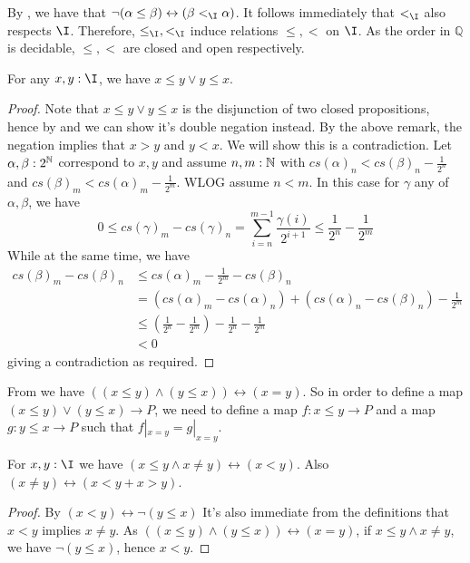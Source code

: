 \begin{remark}\label{NegationOfGeq}
  By , we have that $\neg (\alpha \leq \beta) \leftrightarrow (\beta <_\I \alpha)$. 
  It follows immediately that $<_\I$ also respects $\I$. 
  Therefore, $\leq_\I, <_\I$ induce relations $\leq,<$ on $\I$.
  As the order in $\mathbb Q$ is decidable, $\leq, <$ are closed and open respectively. 
\end{remark} 

\begin{lemma}\label{IntervalOrderLeqOrGeq}
  For any $x,y:\I$, we have $x\leq y \vee y \leq x$. 
\end{lemma}
\begin{proof}
  Note that $x\leq y \vee y \leq x$ is the disjunction of two closed propositions, hence by 
   and  we can show it's double negation instead. 
  By the above remark, the negation implies that $x>y$ and $y<x$. We will show this is a contradiction. 
  Let $\alpha,\beta:2^{\mathbb{N}}$ correspond to $x,y$ and assume $n,m:\mathbb{N}$ with 
  $cs(\alpha)_n < cs(\beta)_n-\frac{1}{2^n}$ and 
  $cs(\beta)_m < cs(\alpha)_m-\frac{1}{2^m}$. 
  WLOG assume $n<m$. In this case for $\gamma$ any of $\alpha,\beta$, we have
  $$0\leq cs(\gamma)_m - cs(\gamma)_n = \sum_{i = n}^{m-1} \frac{\gamma(i)}{2^{i+1}}\leq \frac{1}{2^n}-\frac{1}{2^m}$$
  While at the same time, we have 
  \begin{align}
    cs(\beta)_m - cs(\beta)_n &\leq cs(\alpha)_m -\frac{1}{2^m} - cs (\beta)_n \\
                              & = (cs(\alpha)_m-cs(\alpha)_n)  +      (cs(\alpha)_n -cs(\beta)_n) - \frac{1}{2^m}\\
                              & \leq (\frac{1}{2^n} - \frac{1}{2^m}) -\frac{1}{2^n}               - \frac{1}{2^m}\\
                              &<0
  \end{align}
  giving a contradiction as required. 
\end{proof}

\begin{remark}\label{rmkMapOutOfLeqGeq}
  From  we have $((x\leq y) \wedge (y \leq x )) \leftrightarrow (x = y)$. 
  So in order to define a map $(x \leq y) \vee (y \leq x) \to P$, we need to define a map 
  $f:x\leq y \to P$ and a map $g:y \leq x \to P$ such that $f|_{x = y} = g|_{x=y}$. 
\end{remark}
\begin{corollary}\label{inequality-lesser-greater-than}
    For $x,y:\I$ we have $(x\leq y \wedge x \neq y) \leftrightarrow (x < y)$. 
    Also $(x\neq y) \leftrightarrow (x < y + x > y)$. 
\end{corollary} 
\begin{proof}
    By $(x<y)\leftrightarrow \neg (y\leq x)$
    It's also immediate from the definitions that $x<y$ implies $x\neq y$. 
    As $((x\leq y) \wedge (y \leq x )) \leftrightarrow (x = y)$, 
    if $x\leq y \wedge x \neq y$, we have $\neg (y \leq x)$, hence $x<y$. 
\end{proof}

